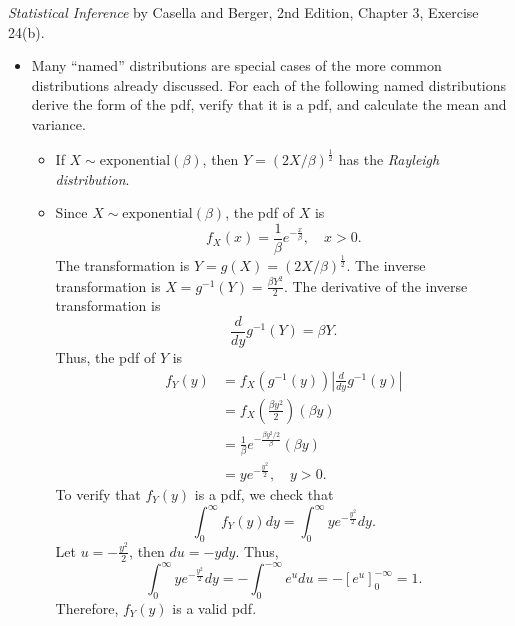 \documentclass[12pt]{article}
\newenvironment{problem}[2][Problem]{\begin{trivlist}
\item[\hskip \labelsep {\bfseries #1}\hskip \labelsep {\bfseries #2.}]}
{\end{trivlist}}
\begin{document}
\begin{problem} {5}
  \textit{Statistical Inference} by Casella and Berger, 2nd Edition, 
  Chapter 3, Exercise 24(b).
  \begin{itemize}
    \item [24.] Many ``named'' distributions are special cases of the
    more common distributions already discussed. For each of the following
    named distributions derive the form of the pdf, verify that it is
    a pdf, and calculate the mean and variance.
    \begin{itemize}
      \item [(b)] If $X \sim \text{exponential}(\beta)$, then 
      $Y = (2X/\beta)^{\frac{1}{2}}$ has the \textit{Rayleigh distribution}.
    \end{itemize}
    \begin{itemize}
      \item [(b)] Since $X \sim \text{exponential}(\beta)$, the pdf of $X$ is
      \[
        f_X(x) = \frac{1}{\beta} e^{-\frac{x}{\beta}}, \quad x > 0.
      \]
      The transformation is $Y = g(X) = (2X/\beta)^{\frac{1}{2}}$.
      The inverse transformation is $X = g^{-1}(Y) = \frac{\beta Y^2}{2}$.
      The derivative of the inverse transformation is
      \[
        \frac{d}{dy} g^{-1}(Y) = \beta Y.
      \]
      Thus, the pdf of $Y$ is
      \[
        \begin{aligned}
          f_Y(y) &= f_X(g^{-1}(y)) 
          \left| \frac{d}{dy} g^{-1}(y) \right| \\
          &= f_X\left(\frac{\beta y^2}{2}\right) (\beta y) \\
          &= \frac{1}{\beta} e^{-\frac{\beta y^2/2}{\beta}} (\beta y) \\
          &= y e^{-\frac{y^2}{2}}, \quad y > 0.
        \end{aligned}
      \]
      To verify that $f_Y(y)$ is a pdf, we check that
      \[
        \int_0^\infty f_Y(y) dy 
        = \int_0^\infty y e^{-\frac{y^2}{2}} dy.
      \]
      Let $u = -\frac{y^2}{2}$, then $du = -y dy$. Thus,
      \[
        \int_0^\infty y e^{-\frac{y^2}{2}} dy 
        = -\int_0^{-\infty} e^u du 
        = -[e^u]_0^{-\infty} 
        = 1.
      \]
      Therefore, $f_Y(y)$ is a valid pdf.


\end{itemize}
\end{itemize}
\end{problem}
\end{document}
